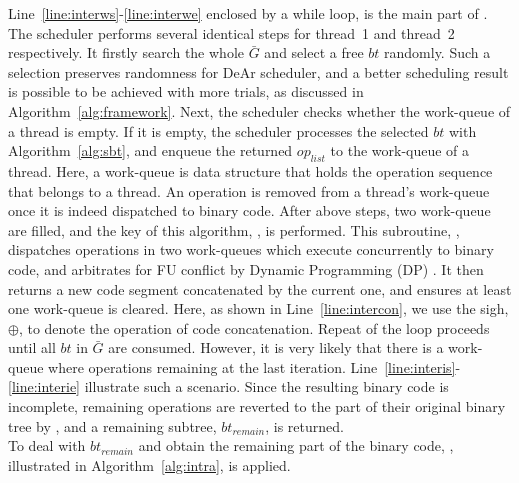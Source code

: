 \documentclass[12pt]{article}
\begin{document}
\begin{CJK}{UTF8}{bkai}
\begin{algorithm}[h!]
\begin{algorithmic}[1]
    \end{algorithmic}
    \label{alg:inter}
\end{algorithm}
        Line~\ref{line:interws}-\ref{line:interwe} enclosed by a while loop, is the main part of .
        The scheduler performs several identical steps for thread~1 and thread~2 respectively.
        It firstly search the whole $\bar{G}$ and select a free $bt$ randomly.
        Such a selection preserves randomness for DeAr scheduler, 
        and a better scheduling result is possible to be achieved with more trials, as discussed in Algorithm~\ref{alg:framework}.
        Next, the scheduler checks whether the work-queue of a thread is empty.
        If it is empty, the scheduler processes the selected $bt$ with Algorithm~\ref{alg:sbt}, 
        and enqueue the returned $op_{list}$ to the work-queue of a thread.
        Here, a work-queue is data structure that holds the operation sequence that belongs to a thread.
        An operation is removed from a thread's work-queue once it is indeed dispatched to binary code.
        After above steps, two work-queue are filled, and the key of this algorithm, , is performed.
        This subroutine, , dispatches operations in two work-queues which execute concurrently to binary code, 
        and arbitrates for FU conflict by Dynamic Programming (DP) \cite{dp}.
        It then returns a new code segment concatenated by the current one, and ensures at least one work-queue is cleared.
        Here, as shown in Line~\ref{line:intercon}, we use the sigh, $\oplus$, to denote the operation of code concatenation.
        Repeat of the loop proceeds until all $bt$ in $\bar{G}$ are consumed.
        However, it is very likely that there is a work-queue where operations remaining at the last iteration.
        Line~\ref{line:interis}-\ref{line:interie} illustrate such a scenario.
        Since the resulting binary code is incomplete, 
        remaining operations are reverted to the part of their original binary tree by ,
        and a remaining subtree, $bt_{remain}$, is returned.
        \\\indent 
        To deal with $bt_{remain}$ and obtain the remaining part of the binary code, 
        , illustrated in Algorithm~\ref{alg:intra}, is applied.
\begin{algorithm}[h]

\end{algorithm}
\end{CJK}
\end{document}
